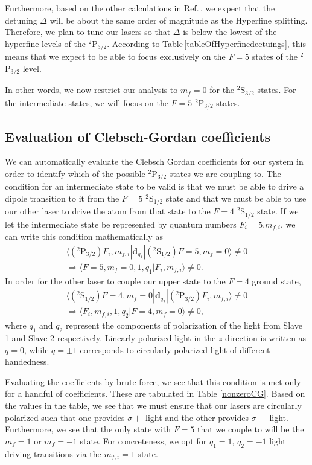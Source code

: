 Furthermore, based on the other calculations in Ref.\,\cite{cjeDiss}, we expect that the detuning $\Delta$ will be about the same order of magnitude as the Hyperfine splitting. Therefore, we plan to tune our lasers so that $\Delta$ is below the lowest of the hyperfine levels of the $^2$P$_{3/2}$. According to Table\,\ref{tableOfHyperfinedeetuings}, this means that we expect to be able to focus exclusively on the $F=5$ states of the $^2$P$_{3/2}$ level.

In other words, we now restrict our analysis to $m_f=0$ for the $^2$S$_{3/2}$ states. For the intermediate states, we will focus on the $F=5$ $^2$P$_{3/2}$ states. 

\subsection{Evaluation of Clebsch-Gordan coefficients}

We can automatically evaluate the Clebsch Gordan coefficients for our system in order to identify which of the possible $^2$P$_{3/2}$ states we are coupling to. The condition for an intermediate state to be valid is that we must be able to drive a dipole transition to it from the $F=5$ $^2$S$_{1/2}$ state and that we must be able to use our other laser to drive the atom from that state to the $F=4$ $^2$S$_{1/2}$ state. If we let the intermediate state be represented by quantum numbers $F_i=5$,$m_{f,i}$, we can write this condition mathematically as  
\begin{multline}
\langle (^2\mathrm{P}_{3/2}) F_i,m_{f,i}|\mathbf{d}_{q_1}|(^2\mathrm{S}_{1/2})F=5,m_f=0\rangle\neq 0 \\
\Rightarrow \langle F=5,m_f=0,1,q_1|F_i,m_{f,i}\rangle \neq 0  \label{thing1}.
\end{multline}
In order for the other laser to couple our upper state to the $F=4$ ground state, 
\begin{multline}
\langle (^2\mathrm{S}_{1/2})F=4,m_f=0|\mathbf{d}_{q_2}|(^2\mathrm{P}_{3/2}) F_i,m_{f,i}\rangle\neq 0 \\
\Rightarrow
\langle F_i,m_{f,i},1,q_2|F=4,m_f=0 \rangle \neq 0 \label{thing2},
\end{multline}
where $q_1$ and $q_2$ represent the components of polarization of the light from Slave 1 and Slave 2 respectively. Linearly polarized light in the $z$ direction is written as $q=0$, while $q=\pm 1$ corresponds to circularly polarized light of different handedness.

Evaluating the coefficients by brute force, we see that this condition is met only for a handful of coefficients. These are tabulated in Table \ref{nonzeroCG}. Based on the values in the table, we see that we must ensure that our lasers are circularly polarized such that one provides $\sigma+$ light and the other provides $\sigma-$ light. Furthermore, we see that the only state with $F=5$ that we couple to will be the $m_f=1$ or $m_f=-1$ state. For concreteness, we opt for $q_1=1$, $q_2=-1$ light driving transitions via the $m_{f,i}=1$ state. 

